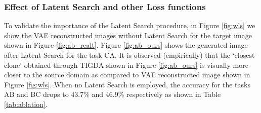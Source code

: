\documentclass[journal,twoside,web]{IEEEtran}
\renewcommand{\textrightarrow}{}
\newcommand{\bb}{\textcolor{black}}
\begin{document}
\subsubsection{Effect of Latent Search and other Loss functions}
To validate the importance of the Latent Search procedure, in Figure \ref{fig:wls} we show the VAE reconstructed images  without Latent Search for the target image shown in Figure \ref{fig:ab_realt}. 
Figure \ref{fig:ab_ours} shows the generated image after Latent Search for the task C\textrightarrow A. It is observed (empirically) that the `closest-clone' obtained through TIGDA shown in Figure \ref{fig:ab_ours} is visually more closer to the source domain  as compared to VAE reconstructed image shown in Figure \ref{fig:wls}. When no  Latent Search is employed, the accuracy for the tasks A\textrightarrow B and B\textrightarrow C drops to 43.7\% and 46.9\% respectively as shown in Table \ref{tab:ablation}. 
\setlength{\textfloatsep}{0pt}
\begin{figure*}
\centering
 \caption{\bb{(a) Accuracy of TIGDA on task A\textrightarrow B by selecting different window sizes in SSIM during Latent Search (b) Performance of TIGDA when the edges of input images are concatenated with different convolutional layers in decoder  (c) Performance of TIGDA when edge concatenation is replaced with different types of skip connections between encoder  and decoder  layers. Window size of 11 gives the best performance. For the same task, edge concatenation is better than skip connections. (d) FID of VAE generated images when TIGDA is trained on dataset A with different number of images ranging from 2,000 (2K) to 10,000 (10K). }}
\label{fig:f_w_e_s}
\end{figure*}
\end{document}
